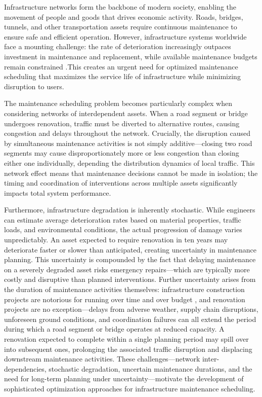 \documentclass[3p, twocolumn]{elsarticle}
\begin{document}
Infrastructure networks form the backbone of modern society, enabling the movement of people and goods that drives economic activity. Roads, bridges, tunnels, and other transportation assets require continuous maintenance to ensure safe and efficient operation. However, infrastructure systems worldwide face a mounting challenge: the rate of deterioration increasingly outpaces investment in maintenance and replacement, while available maintenance budgets remain constrained \citep{noauthor_asces_2017}.This creates an urgent need for optimized maintenance scheduling that maximizes the service life of infrastructure while minimizing disruption to users.

The maintenance scheduling problem becomes particularly complex when considering networks of interdependent assets. When a road segment or bridge undergoes renovation, traffic must be diverted to alternative routes, causing congestion and delays throughout the network. Crucially, the disruption caused by simultaneous maintenance activities is not simply additive---closing two road segments may cause disproportionately more or less congestion than closing either one individually, depending the distribution dynamics of local traffic. This network effect means that maintenance decisions cannot be made in isolation; the timing and coordination of interventions across multiple assets significantly impacts total system performance.

Furthermore, infrastructure degradation is inherently stochastic. While engineers can estimate average deterioration rates based on material properties, traffic loads, and environmental conditions, the actual progression of damage varies unpredictably. An asset expected to require renovation in ten years may deteriorate faster or slower than anticipated, creating uncertainty in maintenance planning. This uncertainty is compounded by the fact that delaying maintenance on a severely degraded asset risks emergency repairs---which are typically more costly and disruptive than planned interventions. Further uncertainty arises from the duration of maintenance activities themselves: infrastructure construction projects are notorious for running over time and over budget \citep{flyvbjerg_how_2003}, and renovation projects are no exception---delays from adverse weather, supply chain disruptions, unforeseen ground conditions, and coordination failures can all extend the period during which a road segment or bridge operates at reduced capacity. A renovation expected to complete within a single planning period may spill over into subsequent ones, prolonging the associated traffic disruption and displacing downstream maintenance activities. These challenges---network inter-dependencies, stochastic degradation, uncertain maintenance durations, and the need for long-term planning under uncertainty---motivate the development of sophisticated optimization approaches for infrastructure maintenance scheduling.
\end{document}
